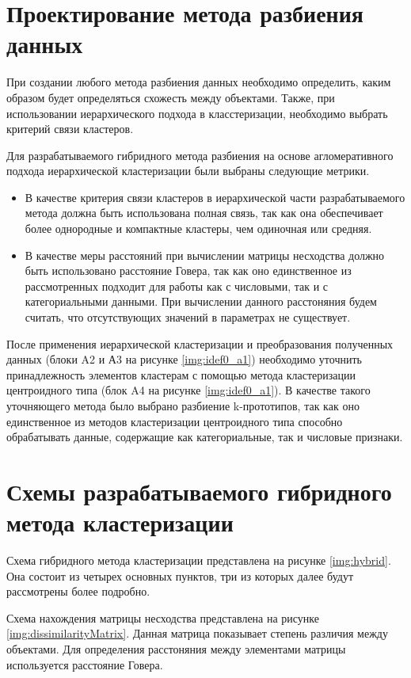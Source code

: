 \section{Проектирование метода разбиения данных}

При создании любого метода разбиения данных необходимо определить, каким образом будет определяться схожесть между объектами. Также, при использовании иерархического подхода в класстеризации, необходимо 
выбрать критерий связи кластеров.

Для разрабатываемого гибридного метода разбиения на основе агломеративного подхода иерархической кластеризации были выбраны следующие метрики.
\begin{itemize}
    \item В качестве критерия связи кластеров в иерархической части разрабатываемого метода должна быть использована полная связь, так как она обеспечивает более однородные и компактные кластеры, чем одиночная или средняя.
    \item В качестве меры расстояний при вычислении матрицы несходства должно быть использовано расстояние Говера, так как оно единственное из рассмотренных подходит для работы как с числовыми, так и с категориальными данными. При вычислении данного расстоняния будем считать, что отсутствующих значений в параметрах не существует.
\end{itemize}

После применения иерархической кластеризации и преобразования полученных данных (блоки A2 и А3 на рисунке \ref{img:idef0_a1}) необходимо уточнить принадлежность элементов кластерам с помощью метода кластеризации центроидного типа (блок A4 на рисунке \ref{img:idef0_a1}). В качестве такого уточняющего метода было выбрано разбиение k-прототипов, так как оно единственное из методов кластеризации центроидного типа способно обрабатывать данные, содержащие как категориальные, так и числовые признаки.
\clearpage

\section{Схемы разрабатываемого гибридного метода кластеризации}

Схема гибридного метода кластеризации представлена на рисунке \ref{img:hybrid}. Она состоит из четырех основных пунктов, три из которых далее будут рассмотрены более подробно.

\clearpage
Схема нахождения матрицы несходства представлена на рисунке \ref{img:dissimilarityMatrix}. Данная матрица показывает степень различия между объектами. Для определения расстоняния между элементами матрицы используется расстояние Говера.

